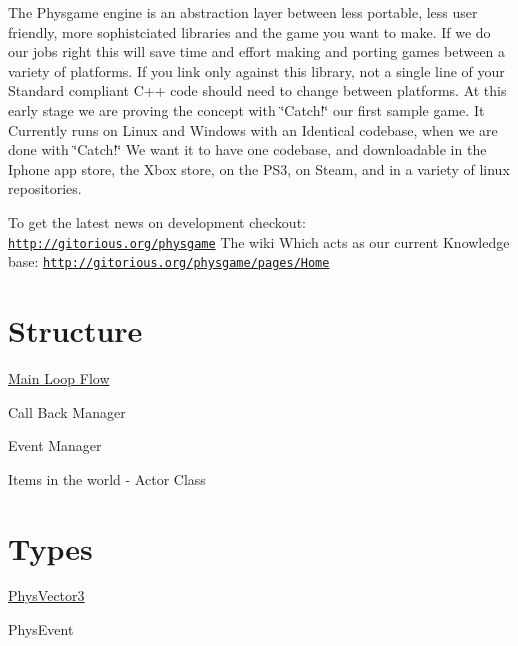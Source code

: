 The Physgame engine is an abstraction layer between less portable, less user friendly, more sophistciated libraries and the game you want to make. If we do our jobs right this will save time and effort making and porting games between a variety of platforms. If you link only against this library, not a single line of your Standard compliant C++ code should need to change between platforms. At this early stage we are proving the concept with \char`\"{}Catch!\char`\"{} our first sample game. It Currently runs on Linux and Windows with an Identical codebase, when we are done with \char`\"{}Catch!\char`\"{} We want it to have one codebase, and downloadable in the Iphone app store, the Xbox store, on the PS3, on Steam, and in a variety of linux repositories.

To get the latest news on development checkout: \href{http://gitorious.org/physgame}{\tt http://gitorious.org/physgame} The wiki Which acts as our current Knowledge base: \href{http://gitorious.org/physgame/pages/Home}{\tt http://gitorious.org/physgame/pages/Home}\hypertarget{index_Engine}{}\section{Structure}\label{index_Engine}
\hyperlink{mainloop1}{Main Loop Flow}

Call Back Manager

Event Manager

Items in the world -\/ Actor Class \hypertarget{index_Data}{}\section{Types}\label{index_Data}
\hyperlink{classPhysVector3}{PhysVector3}

PhysEvent 